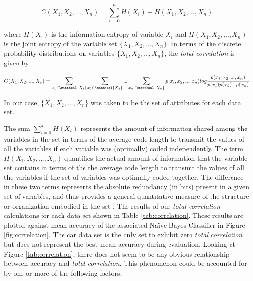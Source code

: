 \documentclass[10pt]{report}
\begin{document}
\begin{equation*}
C(X_1,X_2,...,X_n) = \sum_{i=0}^n H(X_i) - H(X_1,X_2,...,X_n)
\end{equation*}

where \(H(X_i)\) is the information entropy of variable \(X_i\) and
\(H(X_1,X_2,...,X_n)\) is the joint entropy of the variable set
\(\{X_1,X_2,...,X_n\}\). In terms of the discrete probability
  distributions on variables \(\{X_1,X_2,...,X_n\}\), the
  \textit{total correlation} is given by 

\begin{equation*}
C(X_1,X_2,...,X_n) = \sum_{x_1 \in \matthcal{X_1}}\sum_{x_2 \in \matthcal{X_2}}...\sum_{x_n \in \matthcal{X_n}}p(x_i,x_2,...,x_n)log\frac{p(x_i,x_2,...,x_n)}{p(x_1)p(x_2)...p(x_n)}
\end{equation*}

In our case, \(\{X_1,X_2,...,X_n\}\) was taken to be the set of
attributes for each data set. 

The sum \(\sum_{i=0}^n H(X_i)\) represents the amount of
information shared among the variables in the set in terms of the
average code length to transmit the values of all the variables if
each variable was (optimally) coded independently. The term
\(H(X_1,X_2,...,X_n)\) quantifies the actual amount of information
that the variable set contains in terms of the the average code length
to transmit the values of all the variables if the set of variables
was optimally coded together. The difference in these two terms
represents the absolute redundancy (in bits) present in a given set of
variables, and thus provides a general quantitative measure of the
structure or organization embodied in the set
\cite{wiki:total_correlation}. 
The results of our \textit{total correlation} calculations for each
data set shown in Table \ref{tab:correlation}. These results are plotted against
mean accuracy of the associated Na\"{i}ve Bayes Classifier in Figure
\ref{fig:correlation}. The car data set is the only set to exhibit
zero \textit{total correlation} but does not represent the best mean
accuracy during evaluation. Looking at Figure \ref{tab:correlation},
there does not seem to be any obvious relationship between accuracy
and \textit{total correlation}. This phenomenon could be accounted
for by one or more of the following factors:
\end{document}
